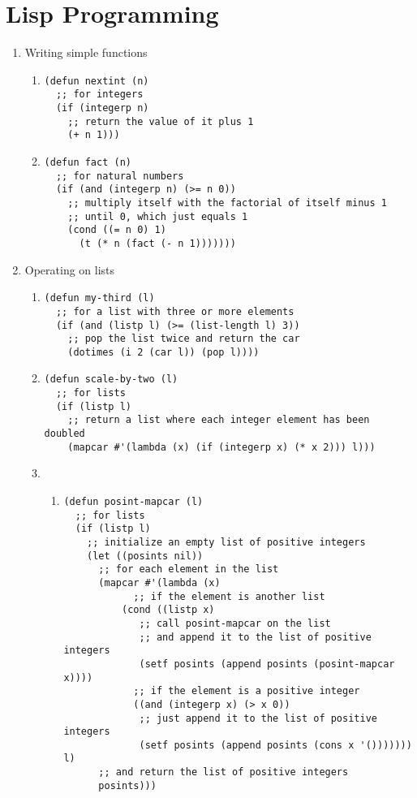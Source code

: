 \documentclass{article}
\begin{document}
\section{Lisp Programming}
\begin{enumerate}
\item Writing simple functions
\begin{enumerate}
\item
\begin{lstlisting}
(defun nextint (n)
  ;; for integers
  (if (integerp n)
    ;; return the value of it plus 1
    (+ n 1)))
\end{lstlisting}

\item
\begin{lstlisting}
(defun fact (n)
  ;; for natural numbers 
  (if (and (integerp n)	(>= n 0))
    ;; multiply itself with the factorial of itself minus 1
    ;; until 0, which just equals 1
    (cond ((= n 0) 1)
	  (t (* n (fact (- n 1)))))))
\end{lstlisting}
\end{enumerate}

\item Operating on lists
\begin{enumerate}
\item
\begin{lstlisting}
(defun my-third (l)
  ;; for a list with three or more elements
  (if (and (listp l) (>= (list-length l) 3))
    ;; pop the list twice and return the car
    (dotimes (i 2 (car l)) (pop l))))
\end{lstlisting}

\item
\begin{lstlisting}
(defun scale-by-two (l)
  ;; for lists
  (if (listp l)
    ;; return a list where each integer element has been doubled
    (mapcar #'(lambda (x) (if (integerp x) (* x 2))) l)))
\end{lstlisting}

\item
\begin{enumerate}
\item
\begin{lstlisting}
(defun posint-mapcar (l)
  ;; for lists
  (if (listp l)
    ;; initialize an empty list of positive integers
    (let ((posints nil))
      ;; for each element in the list
      (mapcar #'(lambda (x)
		  	;; if the element is another list
		  (cond ((listp x)
			 ;; call posint-mapcar on the list
			 ;; and append it to the list of positive integers
			 (setf posints (append posints (posint-mapcar x))))
			;; if the element is a positive integer
			((and (integerp x) (> x 0))
			 ;; just append it to the list of positive integers
			 (setf posints (append posints (cons x '())))))) l)
      ;; and return the list of positive integers
      posints)))
\end{lstlisting}


\end{enumerate}
\end{enumerate}
\end{enumerate}
\end{document}
